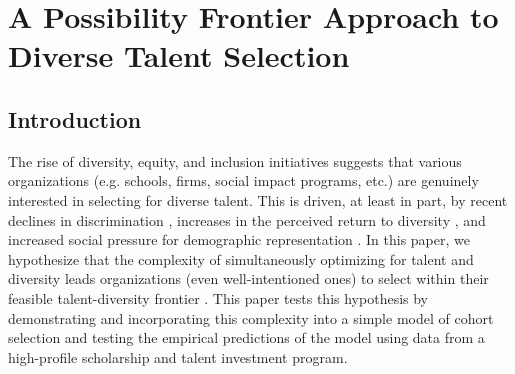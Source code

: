 

\chapter{\label{ch:spf}A Possibility Frontier Approach to Diverse Talent Selection}

\minitoc

\section{Introduction}\label{sec:spfintro}
The rise of diversity, equity, and inclusion initiatives suggests that various organizations (e.g. schools, firms, social impact programs, etc.) are genuinely interested in selecting for diverse talent. This is driven, at least in part, by recent declines in discrimination \cite{hsieh2019allocation}, increases in the perceived return to diversity \cite{deming2017growing, page_diversity_2017, noray2023systemic}, and increased social pressure for demographic representation \cite{minkin2023diversity}. In this paper, we hypothesize that the complexity of simultaneously optimizing for talent and diversity leads organizations (even well-intentioned ones) to select within their feasible talent-diversity frontier \cite{nemhauser1978analysis, huppenkothen2020entrofy}. This paper tests this hypothesis by demonstrating and incorporating this complexity into a simple model of cohort selection and testing the empirical predictions of the model using data from a high-profile scholarship and talent investment program. 

